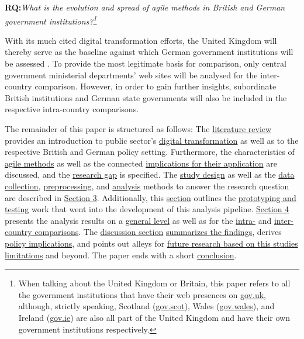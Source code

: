 \begin{addmargin}[2em]{2em}%
\textbf{RQ:}\textit{What is the evolution and spread of agile methods in British and German government institutions?\footnote{When talking about the United Kingdom or Britain, this paper refers to all the government institutions that have their web presences on \href{https://gov.uk}{gov.uk}, although, strictly speaking, Scotland (\href{https://gov.scot}{gov.scot}), Wales (\href{https://gov.wales}{gov.wales}), and Ireland (\href{https://gov.ie}{gov.ie}) are also all part of the United Kingdom and have their own government institutions respectively.}}\label{RQ1}
\end{addmargin}\par 

With its much cited digital transformation efforts, the United Kingdom will thereby serve as the baseline against which German government institutions will be assessed \parencite{Sivarajah2014, Clarke2019}. To provide the most legitimate basis for comparison, only central government ministerial departments' web sites will be analysed for the inter-country comparison. However, in order to gain further insights, subordinate British institutions and German state governments will also be included in the respective intra-country comparisons.

The remainder of this paper is structured as follows: The \hyperref[Literature Review]{literature review} provides an introduction to public sector's \hyperref[Digital Transformation]{digital transformation} as well as to the respective British and German policy setting. Furthermore, the characteristics of \hyperref[Agile Methods]{agile methods} as well as the connected \hyperref[Benefits, Challenges, and Conditions]{implications for their application} are discussed, and the \hyperref[Research Gap]{research gap} is specified. The 
\hyperref[Study Design]{study design} as well as the \hyperref[Data Collection]{data collection}, \hyperref[Data Preprocessing]{preprocessing}, and \hyperref[Data Analysis and Visualisation]{analysis} methods to answer the research question are described in \hyperref[Methods]{Section 3}. Additionally, this \hyperref[Methods]{section} outlines the \hyperref[Prototyping and Testing]{prototyping and testing} work that went into the development of this analysis pipeline. \hyperref[Analysis]{Section 4} presents the analysis results on a \hyperref[General Level]{general level} as well as for the \hyperref[Intra-Country Comparison]{intra-} and \hyperref[Inter-Country Comparison]{inter-country comparisons}. The \hyperref[Discussion]{discussion section} \hyperref[Summary of Findings]{summarizes the findings}, derives \hyperref[Policy Implications]{policy implications}, and points out alleys for \hyperref[Limitations and Future Work]{future research based on this studies limitations} and beyond. The paper ends with a short \hyperref[Conclusion]{conclusion}.



